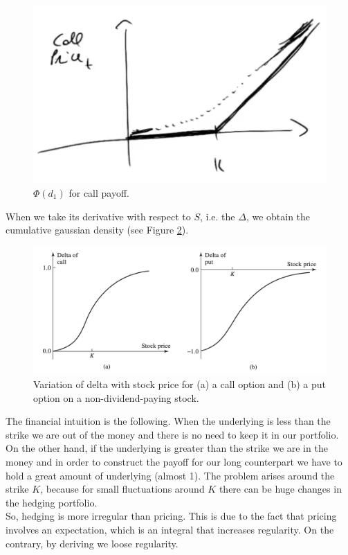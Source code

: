 \begin{figure}[htp]
    \centering
    \includegraphics[scale=0.3]{fig/tmp/fig12.png}
    \caption{$\Phi(d_1)$ for call payoff.}
    \label{fig:priced}
\end{figure}
When we take its derivative with respect to $S$, i.e. the $\Delta$, we obtain the cumulative gaussian density (see Figure \ref{fig:delta}).
\begin{figure}[htp]
    \centering
    \includegraphics[scale=0.2]{fig/tmp/fig13.png}
    \caption{Variation of delta with stock price for (a) a call option and (b) a put option on a non-dividend-paying stock.}
    \label{fig:delta}
\end{figure}
The financial intuition is the following. When the underlying is less than the strike we are out of the money and there is no need to keep it in our portfolio. On the other hand, if the underlying is greater than the strike we are in the money and in order to construct the payoff for our long counterpart we have to hold a great amount of underlying (almost 1). The problem arises around the strike $K$, because for small fluctuations around $K$ there can be huge changes in the hedging portfolio.\\
So, hedging is more irregular than pricing. This is due to the fact that pricing involves an expectation, which is an integral that increases regularity. On the contrary, by deriving we loose regularity.\\
\\
